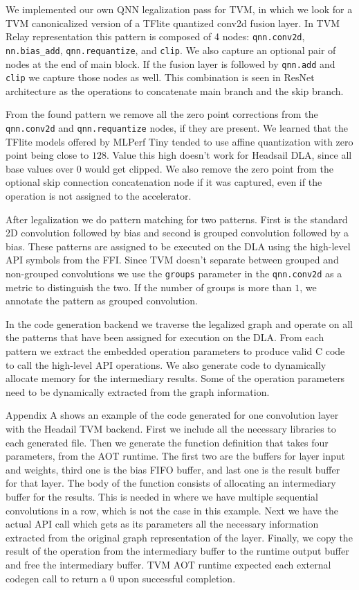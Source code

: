 \documentclass[12pt,a4paper,english
]{tunithesis}
\begin{document}
We implemented our own QNN legalization pass for TVM, in which we look for a TVM canonicalized version of a TFlite quantized conv2d fusion layer. In TVM Relay representation this pattern is composed of 4 nodes: \texttt{qnn.conv2d}, \texttt{nn.bias\_add}, \texttt{qnn.requantize}, and \texttt{clip}. We also capture an optional pair of nodes at the end of main block. If the fusion layer is followed by \texttt{qnn.add} and \texttt{clip} we capture those nodes as well. This combination is seen in ResNet architecture as the operations to concatenate main branch and the skip branch.

From the found pattern we remove all the zero point corrections from the \texttt{qnn.conv2d} and \texttt{qnn.requantize} nodes, if they are present. We learned that the TFlite models offered by MLPerf Tiny tended to use affine quantization with zero point being close to $128$. Value this high doesn't work for Headsail DLA, since all base values over $0$ would get clipped.
We also remove the zero point from the optional skip connection concatenation node if it was captured, even if the operation is not assigned to the accelerator.

After legalization we do pattern matching for two patterns. First is the standard 2D convolution followed by bias and second is grouped convolution followed by a bias. These patterns are assigned to be executed on the DLA using the high-level API symbols from the FFI. Since TVM doesn't separate between grouped and non-grouped convolutions we use the \texttt{groups} parameter in the \texttt{qnn.conv2d} as a metric to distinguish the two. If the number of groups is more than $1$, we annotate the pattern as grouped convolution.

In the code generation backend we traverse the legalized graph and operate on all the patterns that have been assigned for execution on the DLA.
From each pattern we extract the embedded operation parameters to produce valid C code to call the high-level API operations. We also generate code to dynamically allocate memory for the intermediary results.
Some of the operation parameters need to be dynamically extracted from the graph information.

Appendix A shows an example of the code generated for one convolution layer with the Headail TVM backend. First we include all the necessary libraries to each generated file. Then we generate the function definition that takes four parameters, from the AOT runtime. The first two are the buffers for layer input and weights, third one is the bias FIFO buffer, and last one is the result buffer for that layer.
The body of the function consists of allocating an intermediary buffer for the results. This is needed in where we have multiple sequential convolutions in a row, which is not the case in this example.
Next we have the actual API call which gets as its parameters all the necessary information extracted from the original graph representation of the layer. Finally, we copy the result of the operation from the intermediary buffer to the runtime output buffer and free the intermediary buffer. TVM AOT runtime expected each external codegen call to return a 0 upon successful completion.
\end{document}

